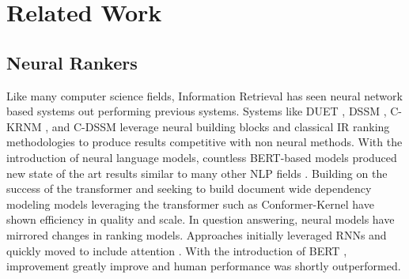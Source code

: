 \section{Related Work}
\subsection{Neural Rankers}
Like many computer science fields, Information Retrieval has seen neural network based systems out performing previous systems. Systems like DUET \cite{Mitra2017LearningTM}, DSSM \cite{Huang2013LearningDS}, C-KRNM \cite{10.1145/3159652.3159659}, and C-DSSM \cite{Shen2014LearningSR} leverage neural building blocks and classical IR ranking methodologies to produce results competitive with non neural methods. With the introduction of neural language models, countless BERT-based models produced new state of the art results similar to many other NLP fields \cite{nogueira2019multi}. Building on the success of the transformer and seeking to build document wide dependency modeling models leveraging the transformer such as Conformer-Kernel\cite{Mitra2020ConformerKernelWQ} have shown efficiency in quality and scale. In question answering, neural models have mirrored changes in ranking models. Approaches initially leveraged RNNs \cite{Shen2016ReasoNetLT,} \cite{Wang2017MachineCU} and quickly moved to include attention \cite{Seo2017BidirectionalAF} . With the introduction of BERT \cite{Devlin2019BERTPO}, improvement greatly improve and human performance was shortly outperformed.  
